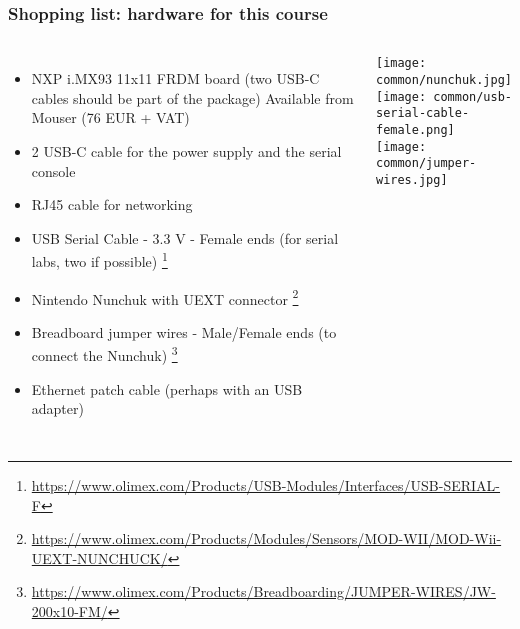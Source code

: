 \begin{frame}
\frametitle{Shopping list: hardware for this course}
  \begin{columns}
    \footnotesize
    \begin{itemize}
      \item NXP i.MX93 11x11 FRDM board (two USB-C cables should be part of the package)
        Available from Mouser (76 EUR + VAT)
      \item 2 USB-C cable for the power supply and the serial console
      \item RJ45 cable for networking
      \item USB Serial Cable - 3.3 V - Female ends (for serial labs, two if possible)
            \footnote{\tiny \url{https://www.olimex.com/Products/USB-Modules/Interfaces/USB-SERIAL-F}}
      \item Nintendo Nunchuk with UEXT connector
            \footnote{\tiny \url{https://www.olimex.com/Products/Modules/Sensors/MOD-WII/MOD-Wii-UEXT-NUNCHUCK/}}
      \item Breadboard jumper wires - Male/Female ends (to connect the Nunchuk)
            \footnote{\tiny \url{https://www.olimex.com/Products/Breadboarding/JUMPER-WIRES/JW-200x10-FM/}}
      \item Ethernet patch cable (perhaps with an USB adapter)
    \end{itemize}
    \texttt{[image: common/nunchuk.jpg]} \\
    \texttt{[image: common/usb-serial-cable-female.png]} \\
    \texttt{[image: common/jumper-wires.jpg]}
  \end{columns}
\end{frame}

